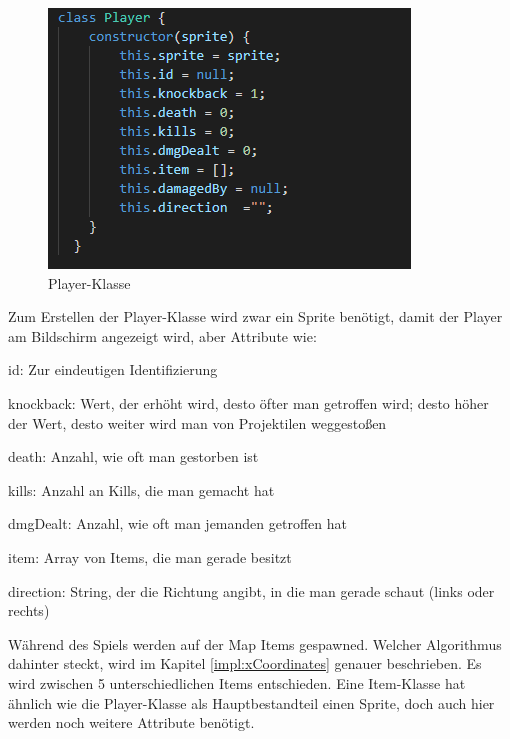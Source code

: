 \begin{figure}[H]
    \centering
    \includegraphics[scale=1]{pics/playerClass.PNG}
    \caption{Player-Klasse}
\end{figure}

Zum Erstellen der Player-Klasse wird zwar ein Sprite benötigt, damit der Player am Bildschirm angezeigt wird, aber Attribute wie:
\begin{compactitem}
    \item id: Zur eindeutigen Identifizierung
    \item knockback: Wert, der erhöht wird, desto öfter man getroffen wird; desto höher der Wert, desto weiter wird man von Projektilen weggestoßen
    \item death: Anzahl, wie oft man gestorben ist
    \item kills: Anzahl an Kills, die man gemacht hat
    \item dmgDealt: Anzahl, wie oft man jemanden getroffen hat
    \item item: Array von Items, die man gerade besitzt
    \item direction: String, der die Richtung angibt, in die man gerade schaut (links oder rechts)
\end{compactitem}

Während des Spiels werden auf der Map Items gespawned. Welcher Algorithmus dahinter steckt, wird im Kapitel \ref{impl:xCoordinates} genauer beschrieben.
Es wird zwischen 5 unterschiedlichen Items entschieden. Eine Item-Klasse hat ähnlich wie die Player-Klasse als Hauptbestandteil einen Sprite, doch auch hier werden noch weitere Attribute benötigt.

